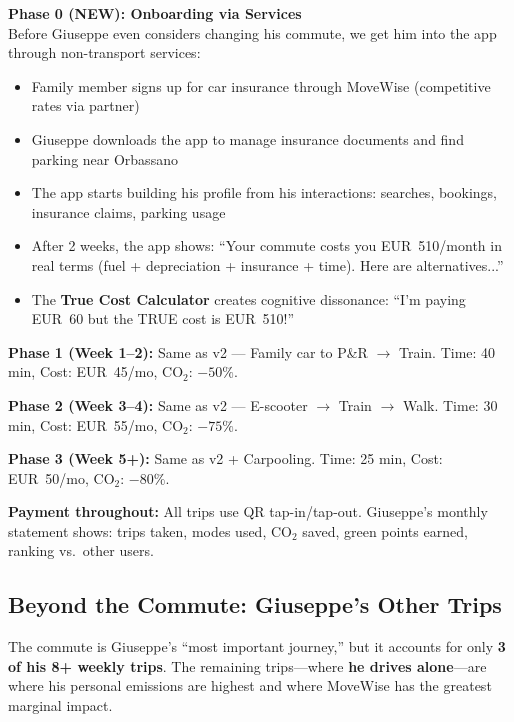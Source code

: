 \documentclass[11pt,a4paper]{article}
\begin{document}
\textbf{Phase 0 (NEW): Onboarding via Services}\\
Before Giuseppe even considers changing his commute, we get him into the app through non-transport services:
\begin{itemize}[noitemsep]
    \item Family member signs up for car insurance through MoveWise (competitive rates via partner)
    \item Giuseppe downloads the app to manage insurance documents and find parking near Orbassano
    \item The app starts building his profile from his interactions: searches, bookings, insurance claims, parking usage
    \item After 2 weeks, the app shows: ``Your commute costs you EUR~510/month in real terms (fuel + depreciation + insurance + time). Here are alternatives...''
    \item The \textbf{True Cost Calculator} creates cognitive dissonance: ``I'm paying EUR~60 but the TRUE cost is EUR~510!''
\end{itemize}

\textbf{Phase 1 (Week 1--2):} Same as v2 --- Family car to P\&R $\rightarrow$ Train. Time: 40 min, Cost: EUR~45/mo, CO$_2$: $-50\%$.

\textbf{Phase 2 (Week 3--4):} Same as v2 --- E-scooter $\rightarrow$ Train $\rightarrow$ Walk. Time: 30 min, Cost: EUR~55/mo, CO$_2$: $-75\%$.

\textbf{Phase 3 (Week 5+):} Same as v2 + Carpooling. Time: 25 min, Cost: EUR~50/mo, CO$_2$: $-80\%$.

\textbf{Payment throughout:} All trips use QR tap-in/tap-out. Giuseppe's monthly statement shows: trips taken, modes used, CO$_2$ saved, green points earned, ranking vs.\ other users.

\subsection{Beyond the Commute: Giuseppe's Other Trips}

The commute is Giuseppe's ``most important journey,'' but it accounts for only \textbf{3 of his 8+ weekly trips}. The remaining trips---where \textbf{he drives alone}---are where his personal emissions are highest and where MoveWise has the greatest marginal impact.
\end{document}
